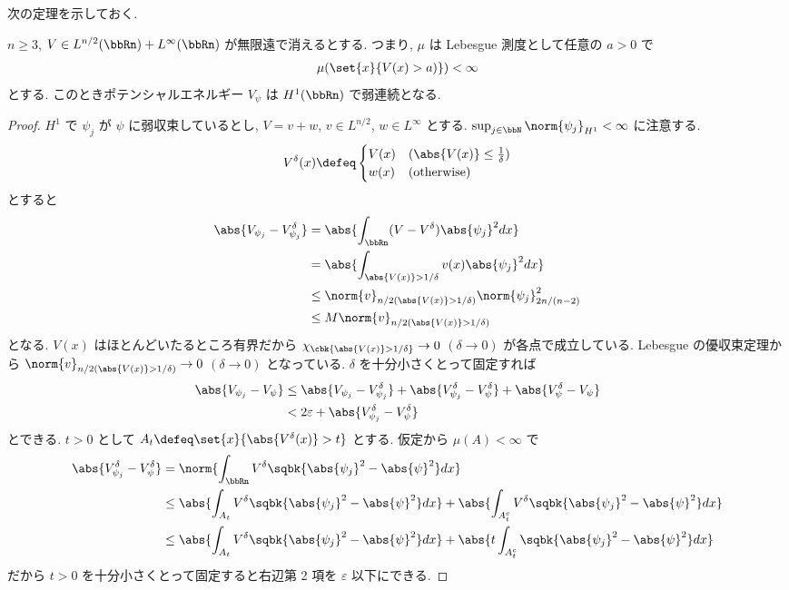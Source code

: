\documentclass[openany, a4paper, oneside]{jsbook}
\begin{document}
次の定理を示しておく.
\begin{thm}
$n \geq 3$, $V \in L^{n/2}(\bbRn) + L^{\infty}(\bbRn)$ が無限遠で消えるとする.
つまり, $\mu$ は Lebesgue 測度として任意の $a>0$ で
\begin{align}
 \mu(\set{x}{V(x) > a)})
 <
 \infty
\end{align}
とする.
このときポテンシャルエネルギー $V_{\psi}$ は $H^1(\bbRn)$ で弱連続となる.
\end{thm}
\begin{proof}
$H^1$ で $\psi_j$ が $\psi$ に弱収束しているとし, $V = v + w$, $v \in L^{n/2}$, $w \in L^{\infty}$ とする.
$\sup_{j \in \bbN} \norm{\psi_j}_{H^1} < \infty$ に注意する.
\begin{align}
 V^{\delta}(x)
 \defeq
 \begin{cases}
  V(x) & (\abs{V(x)} \leq \frac{1}{\delta}) \\
  w(x) & (\text{otherwise})
\end{cases}
\end{align}
とすると
\begin{align}
 \abs{V_{\psi_j} - V_{\psi_j}^{\delta}}
 &=
 \abs{\int_{\bbRn}(V - V^{\delta}) \abs{\psi_j}^2 dx} \\
 &=
 \abs{\int_{\abs{V(x)} > 1 / {\delta}} v(x) \abs{\psi_j}^2 dx} \\
 &\leq
 \norm{v}_{n/2 (\abs{V(x)} > 1 / {\delta})} \norm{\psi_j}_{2n/(n-2)}^2 \\
 &\leq
 M \norm{v}_{n/2 (\abs{V(x)} > 1 /{\delta})}
\end{align}
となる.
$V(x)$ はほとんどいたるところ有界だから $\chi_{\cbk{\abs{V(x)} > 1 / {\delta}}} \to 0$ $(\delta \to 0)$ が各点で成立している.
Lebesgue の優収束定理から $\norm{v}_{n/2( \abs{V(x)} > 1 / {\delta})} \to 0$ $(\delta \to 0)$ となっている.
$\delta$ を十分小さくとって固定すれば
\begin{align}
 \abs{V_{\psi_j} - V_{\psi}}
 &\leq
 \abs{V_{\psi_j} - V_{\psi_j}^{\delta}} +
 \abs{V_{\psi_j}^{\delta} - V_{\psi}^{\delta}} +
 \abs{V_{\psi}^{\delta} - V_{\psi}} \\
 &<
 2 \varepsilon + \abs{V_{\psi_j}^{\delta} - V_{\psi}^{\delta}}
\end{align}
とできる.
$t>0$ として $A_t \defeq \set{x}{\abs{V^{\delta}(x)} > t}$ とする.
仮定から $\mu(A) < \infty$ で
\begin{align}
 \abs{V_{\psi_j}^{\delta} - V_{\psi}^{\delta}}
 &=
 \norm{\int_{\bbRn} V^{\delta}\sqbk{\abs{\psi_j}^2 - \abs{\psi}^2} dx} \\
 &\leq
 \abs{\int_{A_t} V^{\delta} \sqbk{\abs{\psi_j}^2 - \abs{\psi}^2} dx} +
 \abs{\int_{A_t^c} V^{\delta} \sqbk{\abs{\psi_j}^2 - \abs{\psi}^2} dx} \\
 &\leq
 \abs{\int_{A_t} V^{\delta} \sqbk{\abs{\psi_j}^2 - \abs{\psi}^2} dx} +
 \abs{t \int_{A_t^c} \sqbk{\abs{\psi_j}^2 - \abs{\psi}^2} dx}
\end{align}
だから $t > 0$ を十分小さくとって固定すると右辺第 2 項を $\varepsilon$ 以下にできる.


\end{proof}
\end{document}
